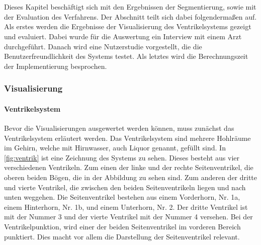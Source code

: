 \chapter{}
\label{sec:results}





Dieses Kapitel beschäftigt sich mit den Ergebnissen der Segmentierung, sowie mit der Evaluation des Verfahrens. Der Abschnitt teilt sich dabei folgendermaßen auf. Als erstes werden die Ergebnisse der Visualisierung des Ventrikelsystems gezeigt und evaluiert. Dabei wurde für die Auswertung ein Interview mit einem Arzt durchgeführt. Danach wird eine Nutzerstudie vorgestellt, die die Benutzerfreundlichkeit des Systems testet. Als letztes wird die Berechnungszeit der Implementierung besprochen.


\subsection{Visualisierung}

\subsubsection{Ventrikelsystem}

Bevor die Visualisierungen ausgewertet werden können, muss zunächst das Ventrikelsystem erläutert werden. Das Ventrikelsystem sind mehrere Hohlräume im Gehirn, welche mit Hirnwasser, auch Liquor genannt, gefüllt sind. In \autoref{fig:ventrik} ist eine Zeichnung des Systems zu sehen. Dieses besteht aus vier verschiedenen Ventrikeln. Zum einen der linke und der rechte Seitenventrikel, die oberen beiden Bögen, die in der Abbildung zu sehen sind. Zum anderen der dritte und vierte Ventrikel, die zwischen den beiden Seitenventrikeln liegen und nach unten weggehen. Die Seitenventrikel bestehen aus einem Vorderhorn, Nr. 1a,  einem Hinterhorn, Nr. 1b, und einem Unterhorn, Nr. 2. Der dritte Ventrikel ist mit der Nummer 3 und der vierte Ventrikel mit der Nummer 4 versehen. Bei der Ventrikelpunktion, wird einer der beiden Seitenventrikel im vorderen Bereich punktiert. Dies macht vor allem die Darstellung der Seitenventrikel relevant.

